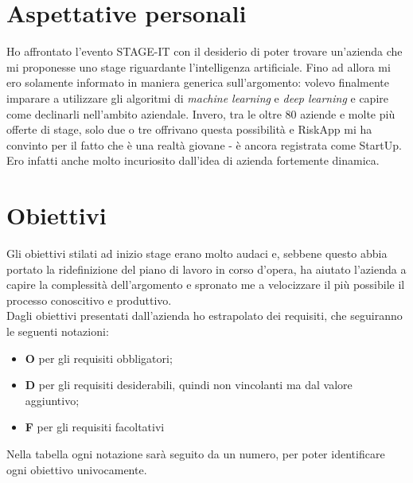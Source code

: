 \section{Aspettative personali}
Ho affrontato l'evento STAGE-IT con il desiderio di poter trovare un'azienda che mi proponesse uno stage riguardante l'intelligenza artificiale. Fino ad allora mi ero solamente informato in maniera generica sull'argomento: volevo finalmente imparare a utilizzare gli algoritmi di \textit{machine learning} e \textit{deep learning} e capire come declinarli nell'ambito aziendale. Invero, tra le oltre 80 aziende e molte più offerte di stage, solo due o tre offrivano questa possibilità e RiskApp mi ha convinto per il fatto che è una realtà giovane - è ancora registrata come StartUp. Ero infatti anche molto incuriosito dall'idea di azienda fortemente dinamica.

\section{Obiettivi}
Gli obiettivi stilati ad inizio stage erano molto audaci e, sebbene questo abbia portato la ridefinizione del piano di lavoro in corso d'opera, ha aiutato l'azienda a capire la complessità dell'argomento e spronato me a velocizzare il più possibile il processo conoscitivo e produttivo.
\medskip
\\Dagli obiettivi presentati dall'azienda ho estrapolato dei requisiti, che seguiranno le seguenti notazioni:
\begin{itemize}
    \item \textbf{O} per gli requisiti obbligatori;
    \item \textbf{D} per gli requisiti desiderabili, quindi non vincolanti ma dal valore aggiuntivo;
    \item \textbf{F} per gli requisiti facoltativi
\end{itemize}
Nella tabella ogni notazione sarà seguito da un numero, per poter identificare ogni obiettivo univocamente.\\

